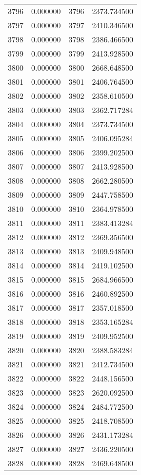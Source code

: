 \documentclass[12pt]{article}
\begin{document}
\begin{longtable}{@{}cccc@{}}
3796 & 0.000000 & 3796 & 2373.734500 \\
3797 & 0.000000 & 3797 & 2410.346500 \\
3798 & 0.000000 & 3798 & 2386.466500 \\
3799 & 0.000000 & 3799 & 2413.928500 \\
3800 & 0.000000 & 3800 & 2668.648500 \\
3801 & 0.000000 & 3801 & 2406.764500 \\
3802 & 0.000000 & 3802 & 2358.610500 \\
3803 & 0.000000 & 3803 & 2362.717284 \\
3804 & 0.000000 & 3804 & 2373.734500 \\
3805 & 0.000000 & 3805 & 2406.095284 \\
3806 & 0.000000 & 3806 & 2399.202500 \\
3807 & 0.000000 & 3807 & 2413.928500 \\
3808 & 0.000000 & 3808 & 2662.280500 \\
3809 & 0.000000 & 3809 & 2447.758500 \\
3810 & 0.000000 & 3810 & 2364.978500 \\
3811 & 0.000000 & 3811 & 2383.413284 \\
3812 & 0.000000 & 3812 & 2369.356500 \\
3813 & 0.000000 & 3813 & 2409.948500 \\
3814 & 0.000000 & 3814 & 2419.102500 \\
3815 & 0.000000 & 3815 & 2684.966500 \\
3816 & 0.000000 & 3816 & 2460.892500 \\
3817 & 0.000000 & 3817 & 2357.018500 \\
3818 & 0.000000 & 3818 & 2353.165284 \\
3819 & 0.000000 & 3819 & 2409.952500 \\
3820 & 0.000000 & 3820 & 2388.583284 \\
3821 & 0.000000 & 3821 & 2412.734500 \\
3822 & 0.000000 & 3822 & 2448.156500 \\
3823 & 0.000000 & 3823 & 2620.092500 \\
3824 & 0.000000 & 3824 & 2484.772500 \\
3825 & 0.000000 & 3825 & 2418.708500 \\
3826 & 0.000000 & 3826 & 2431.173284 \\
3827 & 0.000000 & 3827 & 2436.220500 \\
3828 & 0.000000 & 3828 & 2469.648500 \\

\end{longtable}
\end{document}
